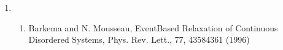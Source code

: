 \documentclass[letterpaper,11pt,english]{sphinxmanual}
\begin{document}
\begin{enumerate}
%
\setcounter{enumi}{6}
\item {} \begin{enumerate}
%
\setcounter{enumii}{19}
\item {} 
Barkema and N. Mousseau, Event\sphinxhyphen{}Based Relaxation of Continuous Disordered Systems, Phys. Rev. Lett., 77, 4358\sphinxhyphen{}4361 (1996)

\end{enumerate}

\end{enumerate}



\renewcommand{\indexname}{Index}
\printindex
\end{document}
